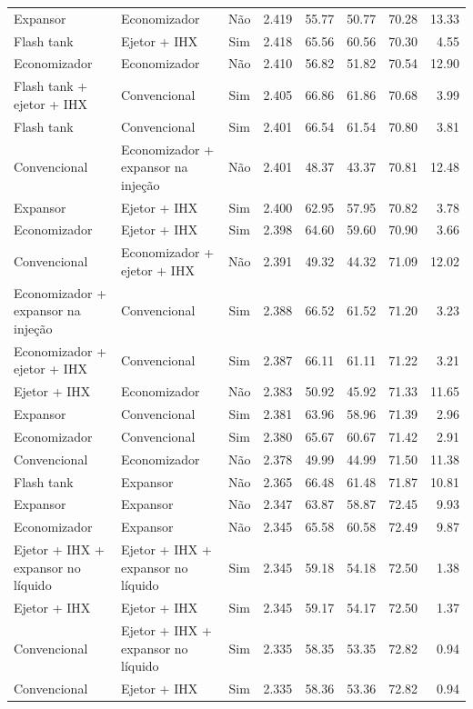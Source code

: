 {\begin{tabular}{llcrrrrr}
Expansor & Economizador & Não & 2.419 & 55.77 & 50.77 & 70.28 & 13.33 \\
Flash tank & Ejetor + IHX & Sim & 2.418 & 65.56 & 60.56 & 70.30 & 4.55 \\
Economizador & Economizador & Não & 2.410 & 56.82 & 51.82 & 70.54 & 12.90 \\
Flash tank + ejetor + IHX & Convencional & Sim & 2.405 & 66.86 & 61.86 & 70.68 & 3.99 \\
Flash tank & Convencional & Sim & 2.401 & 66.54 & 61.54 & 70.80 & 3.81 \\
Convencional & Economizador + expansor na injeção & Não & 2.401 & 48.37 & 43.37 & 70.81 & 12.48 \\
Expansor & Ejetor + IHX & Sim & 2.400 & 62.95 & 57.95 & 70.82 & 3.78 \\
Economizador & Ejetor + IHX & Sim & 2.398 & 64.60 & 59.60 & 70.90 & 3.66 \\
Convencional & Economizador + ejetor + IHX & Não & 2.391 & 49.32 & 44.32 & 71.09 & 12.02 \\
Economizador + expansor na injeção & Convencional & Sim & 2.388 & 66.52 & 61.52 & 71.20 & 3.23 \\
Economizador + ejetor + IHX & Convencional & Sim & 2.387 & 66.11 & 61.11 & 71.22 & 3.21 \\
Ejetor + IHX & Economizador & Não & 2.383 & 50.92 & 45.92 & 71.33 & 11.65 \\
Expansor & Convencional & Sim & 2.381 & 63.96 & 58.96 & 71.39 & 2.96 \\
Economizador & Convencional & Sim & 2.380 & 65.67 & 60.67 & 71.42 & 2.91 \\
Convencional & Economizador & Não & 2.378 & 49.99 & 44.99 & 71.50 & 11.38 \\
Flash tank & Expansor & Não & 2.365 & 66.48 & 61.48 & 71.87 & 10.81 \\
Expansor & Expansor & Não & 2.347 & 63.87 & 58.87 & 72.45 & 9.93 \\
Economizador & Expansor & Não & 2.345 & 65.58 & 60.58 & 72.49 & 9.87 \\
Ejetor + IHX + expansor no líquido & Ejetor + IHX + expansor no líquido & Sim & 2.345 & 59.18 & 54.18 & 72.50 & 1.38 \\
Ejetor + IHX & Ejetor + IHX & Sim & 2.345 & 59.17 & 54.17 & 72.50 & 1.37 \\
Convencional & Ejetor + IHX + expansor no líquido & Sim & 2.335 & 58.35 & 53.35 & 72.82 & 0.94 \\
Convencional & Ejetor + IHX & Sim & 2.335 & 58.36 & 53.36 & 72.82 & 0.94 \\

\end{tabular}}
